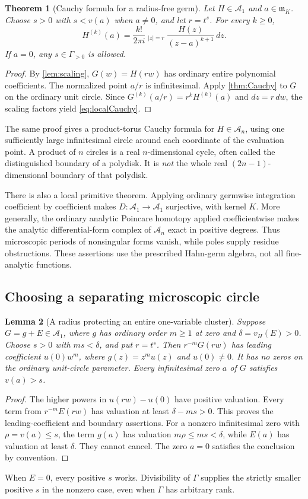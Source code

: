 \documentclass[11pt,letterpaper]{article}
\newtheorem{theorem}{Theorem}[section]
\newtheorem{lemma}[theorem]{Lemma}
\theoremstyle{definition}
\theoremstyle{remark}
\newcommand{\Acal}{\mathscr A}
\newcommand{\m}{\mathfrak m}
\newcommand{\vH}{v_{\!H}}
\newcommand{\HCoint}{\mathop{\oint^{\!H}}\nolimits}
\numberwithin{equation}{section}
\begin{document}
\begin{theorem}[Cauchy formula for a radius-free germ]\label{thm:localCauchy}
Let $H\in\Acal_1$ and $a\in\m_K$. Choose $s>0$ with $s<v(a)$ when $a\ne0$, and let $r=t^s$. For every $k\ge0$,
\begin{equation}\label{eq:localCauchy}
\boxed{\quad H^{(k)}(a)=\frac{k!}{2\pi i}
\HCoint_{|z|=r}\frac{H(z)}{(z-a)^{k+1}}\,dz.\quad}
\end{equation}
If $a=0$, any $s\in\Gamma_{>0}$ is allowed.
\end{theorem}
\begin{proof}
By \cref{lem:scaling}, $G(w)=H(rw)$ has ordinary entire polynomial coefficients. The normalized point $a/r$ is infinitesimal. Apply \cref{thm:Cauchy} to $G$ on the ordinary unit circle. Since $G^{(k)}(a/r)=r^kH^{(k)}(a)$ and $dz=r\,dw$, the scaling factors yield \eqref{eq:localCauchy}.
\end{proof}
The same proof gives a product-torus Cauchy formula for $H\in\Acal_n$, using one sufficiently large infinitesimal circle around each coordinate of the evaluation point. A product of $n$ circles is a real $n$-dimensional cycle, often called the distinguished boundary of a polydisk. It is \emph{not} the whole real $(2n-1)$-dimensional boundary of that polydisk.

There is also a local primitive theorem. Applying ordinary germwise integration coefficient by coefficient makes $D:\Acal_1\to\Acal_1$ surjective, with kernel $K$. More generally, the ordinary analytic Poincare homotopy applied coefficientwise makes the analytic differential-form complex of $\Acal_n$ exact in positive degrees. Thus microscopic periods of nonsingular forms vanish, while poles supply residue obstructions. These assertions use the prescribed Hahn-germ algebra, not all fine-analytic functions.

\subsection{Choosing a separating microscopic circle}
\begin{lemma}[A radius protecting an entire one-variable cluster]\label{lem:protect}
Suppose $G=g+E\in\Acal_1$, where $g$ has ordinary order $m\ge1$ at zero and $\delta=\vH(E)>0$. Choose $s>0$ with $ms<\delta$, and put $r=t^s$. Then $r^{-m}G(rw)$ has leading coefficient $u(0)w^m$, where $g(z)=z^mu(z)$ and $u(0)\ne0$. It has no zeros on the ordinary unit-circle parameter. Every infinitesimal zero $a$ of $G$ satisfies $v(a)>s$.
\end{lemma}
\begin{proof}
The higher powers in $u(rw)-u(0)$ have positive valuation. Every term from $r^{-m}E(rw)$ has valuation at least $\delta-ms>0$. This proves the leading-coefficient and boundary assertions. For a nonzero infinitesimal zero with $\rho=v(a)\le s$, the term $g(a)$ has valuation $m\rho\le ms<\delta$, while $E(a)$ has valuation at least $\delta$. They cannot cancel. The zero $a=0$ satisfies the conclusion by convention.
\end{proof}
When $E=0$, every positive $s$ works. Divisibility of $\Gamma$ supplies the strictly smaller positive $s$ in the nonzero case, even when $\Gamma$ has arbitrary rank.
\end{document}
